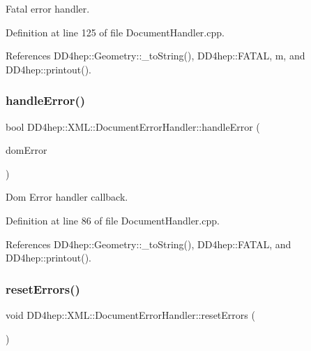 Fatal error handler. 



Definition at line 125 of file Document\+Handler.\+cpp.



References D\+D4hep\+::\+Geometry\+::\+\_\+to\+String(), D\+D4hep\+::\+F\+A\+T\+AL, m, and D\+D4hep\+::printout().

\hypertarget{class_d_d4hep_1_1_x_m_l_1_1_document_error_handler_a830b9a2a1ae3a2e35ae753b70ae18c52}{}\label{class_d_d4hep_1_1_x_m_l_1_1_document_error_handler_a830b9a2a1ae3a2e35ae753b70ae18c52} 
\subsubsection{\texorpdfstring{handle\+Error()}{handleError()}}
{\footnotesize\ttfamily bool D\+D4hep\+::\+X\+M\+L\+::\+Document\+Error\+Handler\+::handle\+Error (\begin{DoxyParamCaption}\item[{const D\+O\+M\+Error \&}]{dom\+Error }\end{DoxyParamCaption})\hspace{0.3cm}{\ttfamily [virtual]}}



Dom Error handler callback. 



Definition at line 86 of file Document\+Handler.\+cpp.



References D\+D4hep\+::\+Geometry\+::\+\_\+to\+String(), D\+D4hep\+::\+F\+A\+T\+AL, and D\+D4hep\+::printout().

\hypertarget{class_d_d4hep_1_1_x_m_l_1_1_document_error_handler_aed02c6f154e651f714709b8448ba8fe4}{}\label{class_d_d4hep_1_1_x_m_l_1_1_document_error_handler_aed02c6f154e651f714709b8448ba8fe4} 
\subsubsection{\texorpdfstring{reset\+Errors()}{resetErrors()}}
{\footnotesize\ttfamily void D\+D4hep\+::\+X\+M\+L\+::\+Document\+Error\+Handler\+::reset\+Errors (\begin{DoxyParamCaption}{ }\end{DoxyParamCaption})\hspace{0.3cm}{\ttfamily [inline]}}




